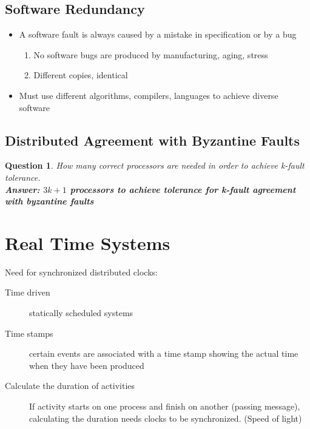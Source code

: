 \documentclass[a4paper]{article}
\newtheorem{question}{Question}
\begin{document}
\subsection{Software Redundancy}
\begin{itemize}
		\item A software fault is always caused by a mistake in specification or
				by a bug
				\begin{enumerate}
						\item No software bugs are produced by manufacturing,
								aging, stress
						\item Different copies, identical
				\end{enumerate}
		\item Must use different algorithms, compilers, languages to achieve
				diverse software
\end{itemize}
\subsection{Distributed Agreement with Byzantine Faults}
\begin{question}
		How many correct processors are needed in order to achieve k-fault
		tolerance.\\
		\textbf{Answer: $3k+1$ processors to achieve tolerance for k-fault agreement
		with byzantine faults}
\end{question}
\section{Real Time Systems}
Need for synchronized distributed clocks:
\begin{description}
		\item[Time driven] statically scheduled systems
		\item[Time stamps] certain events are associated with a time stamp
				showing the actual time when they have been produced
		\item[Calculate the duration of activities] If activity starts on one
				process and finish on another (passing message), calculating the
				duration needs clocks to be synchronized. (Speed of light)
\end{description}
\end{document}
